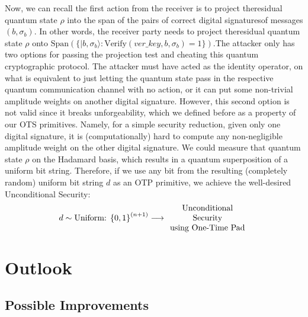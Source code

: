 \documentclass[12pt]{article}
\begin{document}
    Now, we can recall the first action from the receiver is to project the\break residual quantum state $\rho$ into the span of the pairs of correct digital signatures\break of messages $(b, {\sigma}_{b})$. In other words, the receiver party needs to project the\break residual quantum state $\rho$ onto $\text{Span}( \{ |b, {\sigma}_{b} \rangle: \text{Verify}(ver\_key, b, {\sigma}_{b}) = 1 \} )$.\break The attacker only has two options for passing the projection test and cheating this quantum cryptographic protocol. The attacker must have acted as the identity operator, on what is equivalent to just letting the quantum state pass in the respective quantum communication channel with no action, or it can put some non-trivial amplitude weights on another digital signature. However, this second option is not valid since it breaks unforgeability, which we defined before as a property of our OTS primitives. Namely, for a simple security reduction, given only one digital signature, it is (computationally) hard to compute any non-negligible amplitude weight on the other digital signature. We could measure that quantum state $\rho$ on the Hadamard basis, which results in a quantum superposition of a uniform bit string. Therefore, if we use any bit from the resulting (completely random) uniform bit string $d$ as an OTP primitive, we achieve the well-desired Unconditional Security:
    $$ d \sim \mathrm{\text{Uniform: }} { \{ 0, 1 \} }^{(n + 1)} \longrightarrow \parbox{23ex}{\centering Unconditional Security\\using One-Time Pad}$$

    
    \section{Outlook}
    \label{sec:outlook}

    
    \subsection{Possible Improvements}
    \label{subsec:possible-improvements}
\end{document}
